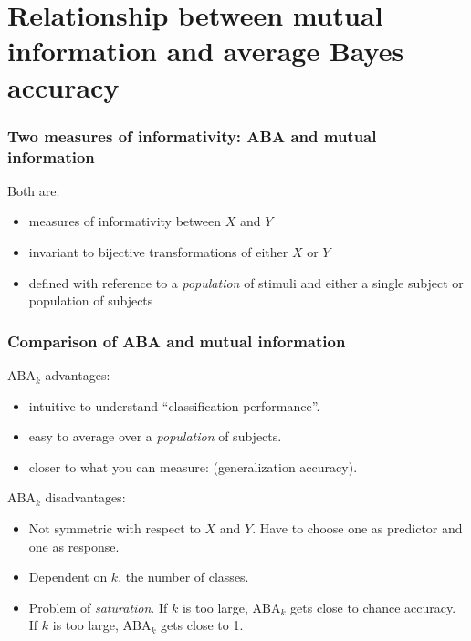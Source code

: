 \documentclass{beamer}
\begin{document}
\section{Relationship between mutual information and average Bayes accuracy}

\begin{frame}
\sectionpage
\end{frame}

\begin{frame}
\frametitle{Two measures of informativity: ABA and mutual information}
Both are:
\begin{itemize}
\item measures of informativity between $X$ and $Y$
\item invariant to bijective transformations of either $X$ or $Y$
\item defined with reference to a \emph{population} of stimuli and either a single subject or population of subjects
\end{itemize}
\end{frame}

\begin{frame}
\frametitle{Comparison of ABA and mutual information}
$\text{ABA}_k$ advantages:
\begin{itemize}
\item intuitive to understand ``classification performance''.
\item easy to average over a \emph{population} of subjects.
\item closer to what you can measure: (generalization accuracy).
\end{itemize}
$\text{ABA}_k$ disadvantages:
\begin{itemize}
\item Not symmetric with respect to $X$ and $Y$.  Have to choose one as predictor and one as response.
\item Dependent on $k$, the number of classes.
\item Problem of \emph{saturation}.  If $k$ is too large,
  $\text{ABA}_k$ gets close to chance accuracy.  If $k$ is too large,
  $\text{ABA}_k$ gets close to 1.
\end{itemize}
\end{frame}
\end{document}
